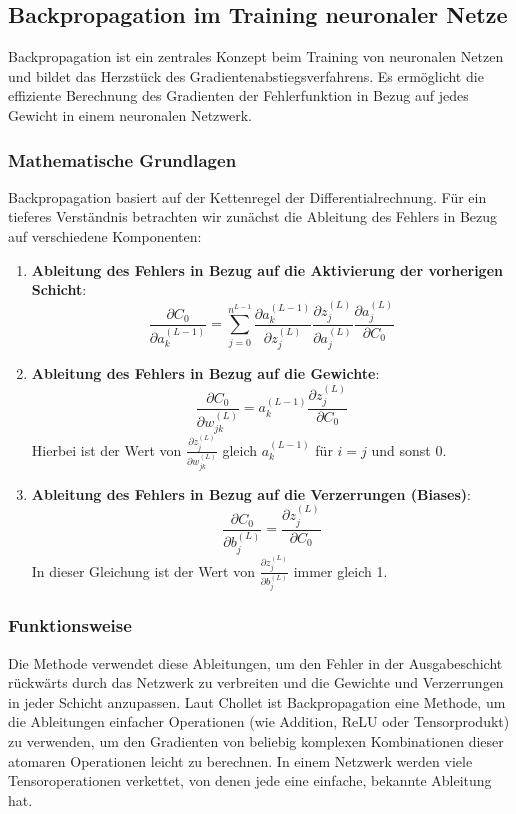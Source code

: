 \newpage
\subsection{Backpropagation im Training neuronaler Netze}

Backpropagation ist ein zentrales Konzept beim Training von neuronalen Netzen und bildet das Herzstück des Gradientenabstiegsverfahrens. Es ermöglicht die effiziente Berechnung des Gradienten der Fehlerfunktion in Bezug auf jedes Gewicht in einem neuronalen Netzwerk.

\subsubsection{Mathematische Grundlagen}

Backpropagation basiert auf der Kettenregel der Differentialrechnung. Für ein tieferes Verständnis betrachten wir zunächst die Ableitung des Fehlers in Bezug auf verschiedene Komponenten:

\begin{enumerate}
    \item \textbf{Ableitung des Fehlers in Bezug auf die Aktivierung der vorherigen Schicht}:
    \[
    \frac{\partial C_0}{\partial a_k^{(L-1)}} = \sum_{j=0}^{n^{L-1}} \frac{\partial a_k^{(L-1)}}{\partial z_j^{(L)}} \frac{\partial z_j^{(L)}}{\partial a_j^{(L)}} \frac{\partial a_j^{(L)}}{\partial C_0}
    \]

    \item \textbf{Ableitung des Fehlers in Bezug auf die Gewichte}:
    \[
    \frac{\partial C_0}{\partial w_{jk}^{(L)}} = a_k^{(L-1)} \frac{\partial z_j^{(L)}}{\partial C_0}
    \]
    Hierbei ist der Wert von \(\frac{\partial z_j^{(L)}}{\partial w_{jk}^{(L)}}\) gleich \(a_k^{(L-1)}\) für \(i=j\) und sonst 0.

    \item \textbf{Ableitung des Fehlers in Bezug auf die Verzerrungen (Biases)}:
    \[
    \frac{\partial C_0}{\partial b_j^{(L)}} = \frac{\partial z_j^{(L)}}{\partial C_0}
    \]
    In dieser Gleichung ist der Wert von \(\frac{\partial z_j^{(L)}}{\partial b_j^{(L)}}\) immer gleich 1.
\end{enumerate}

\subsubsection{Funktionsweise}

Die Methode verwendet diese Ableitungen, um den Fehler in der Ausgabeschicht rückwärts durch das Netzwerk zu verbreiten und die Gewichte und Verzerrungen in jeder Schicht anzupassen. Laut Chollet \cite[p.~80]{Chollet2021} ist Backpropagation eine Methode, um die Ableitungen einfacher Operationen (wie Addition, ReLU oder Tensorprodukt) zu verwenden, um den Gradienten von beliebig komplexen Kombinationen dieser atomaren Operationen leicht zu berechnen. In einem Netzwerk werden viele Tensoroperationen verkettet, von denen jede eine einfache, bekannte Ableitung hat.

